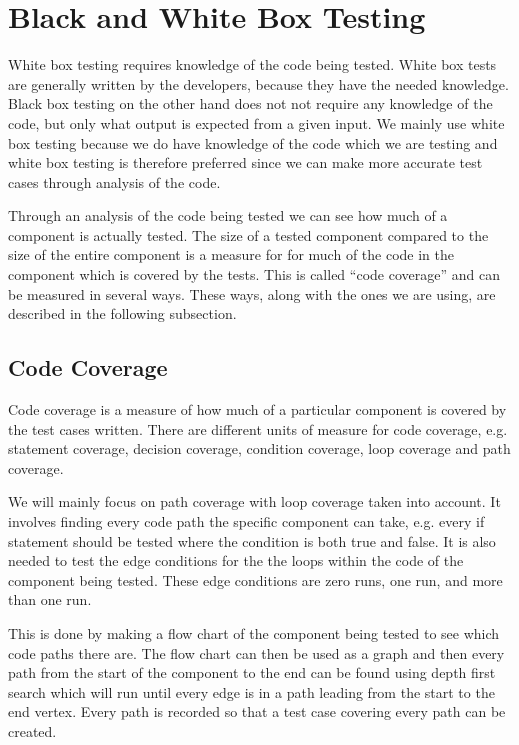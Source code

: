 \section{Black and White Box Testing}
\label{chap:whiteBox}
White box testing requires knowledge of the code being tested.
White box tests are generally written by the developers, because they have the needed knowledge.
Black box testing on the other hand does not not require any knowledge of the code, but only what output is expected from a given input.
We mainly use white box testing because we do have knowledge of the code which we are testing and white box testing is therefore preferred since we can make more accurate test cases through analysis of the code.

Through an analysis of the code being tested we can see how much of a component is actually tested.
The size of a tested component compared to the size of the entire component is a measure for for much of the code in the component which is covered by the tests.
This is called ``code coverage'' and can be measured in several ways.
These ways, along with the ones we are using, are described in the following subsection.

\subsection{Code Coverage}
\label{sub:codeCoverage}
Code coverage is a measure of how much of a particular component is covered by the test cases written. \cite{cornett10}
There are different units of measure for code coverage, e.g. statement coverage, decision coverage, condition coverage, loop coverage and path coverage.

We will mainly focus on path coverage with loop coverage taken into account.
It involves finding every code path the specific component can take, e.g. every if statement should be tested where the condition is both true and false.
It is also needed to test the edge conditions for the the loops within the code of the component being tested.
These edge conditions are zero runs, one run, and more than one run.

This is done by making a flow chart of the component being tested to see which code paths there are.
The flow chart can then be used as a graph and then every path from the start of the component to the end can be found using depth first search which will run until every edge is in a path leading from the start to the end vertex.
Every path is recorded so that a test case covering every path can be created. \cite{whiteBox}




\begin{comment}
\subsection{Our Use of White Box Testing}
We have used white box testing to test our tool component and the parts of the model component which we have wrote our selves -- the ADO.NET was used to generate much of the needed model.
In order to insure that the code of the parts we were testing was covered we created a flow chart of the most complicated parts.
\end{comment}